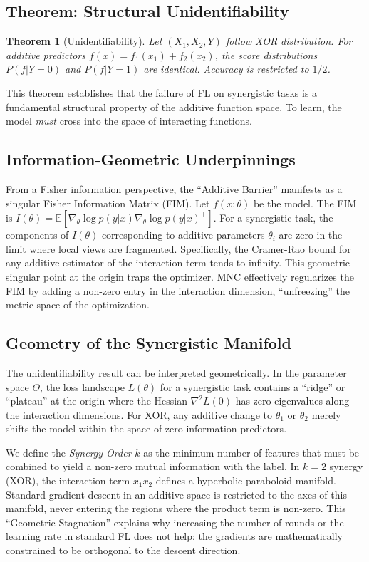\documentclass{article}
\theoremstyle{plain}
\newtheorem{theorem}{Theorem}[section]
\theoremstyle{definition}
\newcommand{\E}{\mathbb{E}}
\begin{document}
\subsection{Theorem: Structural Unidentifiability}
\begin{theorem}[Unidentifiability]
\label{thm:unident_main}
Let $(X_1, X_2, Y)$ follow XOR distribution. For additive predictors $f(x) = f_1(x_1) + f_2(x_2)$, the score distributions $P(f | Y=0)$ and $P(f | Y=1)$ are identical. Accuracy is restricted to $1/2$.
\end{theorem}
This theorem establishes that the failure of FL on synergistic tasks is a fundamental structural property of the additive function space. To learn, the model \emph{must} cross into the space of interacting functions.

\subsection{Information-Geometric Underpinnings}
From a Fisher information perspective, the ``Additive Barrier'' manifests as a singular Fisher Information Matrix (FIM). Let $f(x; \theta)$ be the model. The FIM is $I(\theta) = \E[\nabla_\theta \log p(y|x) \nabla_\theta \log p(y|x)^\top]$. For a synergistic task, the components of $I(\theta)$ corresponding to additive parameters $\theta_i$ are zero in the limit where local views are fragmented. Specifically, the Cramer-Rao bound for any additive estimator of the interaction term tends to infinity. This geometric singular point at the origin traps the optimizer. MNC effectively regularizes the FIM by adding a non-zero entry in the interaction dimension, ``unfreezing'' the metric space of the optimization.

\subsection{Geometry of the Synergistic Manifold}
\label{subsec:geometry}
The unidentifiability result can be interpreted geometrically. In the parameter space $\Theta$, the loss landscape $L(\theta)$ for a synergistic task contains a ``ridge'' or ``plateau'' at the origin where the Hessian $\nabla^2 L(0)$ has zero eigenvalues along the interaction dimensions. For XOR, any additive change to $\theta_1$ or $\theta_2$ merely shifts the model within the space of zero-information predictors.

We define the \emph{Synergy Order} $k$ as the minimum number of features that must be combined to yield a non-zero mutual information with the label. In $k=2$ synergy (XOR), the interaction term $x_1x_2$ defines a hyperbolic paraboloid manifold. Standard gradient descent in an additive space is restricted to the axes of this manifold, never entering the regions where the product term is non-zero. This ``Geometric Stagnation'' explains why increasing the number of rounds or the learning rate in standard FL does not help: the gradients are mathematically constrained to be orthogonal to the descent direction.
\end{document}
